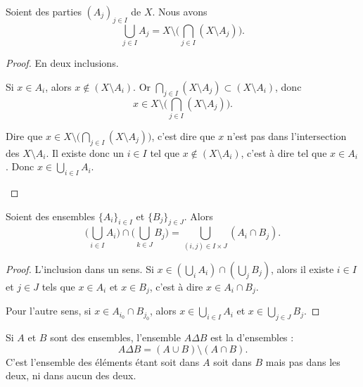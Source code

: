 \begin{lemma}	\label{LEMooMDTPooAhmYqv}
	Soient des parties \( (A_j)_{j\in I}\) de \( X\). Nous avons
	\begin{equation}
		\bigcup_{j\in I}A_j=X\setminus\Big( \bigcap_{j\in I}(X\setminus A_j) \Big).
	\end{equation}
\end{lemma}

\begin{proof}
	En deux inclusions.
	\begin{subproof}
		Si \( x\in A_i\), alors \( x\not\in (X\setminus A_i)\). Or \( \bigcap_{j\in I}(X\setminus A_j)\subset (X\setminus A_i)\), donc
		\begin{equation}
			x\in  X\setminus\Big( \bigcap_{j\in I}(X\setminus A_j) \Big).
		\end{equation}

		Dire que \( x\in  X\setminus\Big( \bigcap_{j\in I}(X\setminus A_j) \Big)\), c'est dire que \( x\) n'est pas dans l'intersection des \( X\setminus A_i\). Il existe donc un \( i\in I\) tel que \( x\notin (X\setminus A_i)\), c'est à dire tel que \( x\in A_i\). Donc \( x\in\bigcup_{i\in I}A_i\).
	\end{subproof}
\end{proof}

\begin{lemma}	\label{LEMooPWUHooMBKquL}
	Soient des ensembles \( \{ A_i \}_{i\in I}\) et \( \{ B_j \}_{j\in J}\). Alors
	\begin{equation}
		\Big( \bigcup_{i\in I}A_i \Big)\cap \Big( \bigcup_{k\in J}B_j \Big)=\bigcup_{(i,j)\in I\times J}(A_i\cap B_j).
	\end{equation}
\end{lemma}

\begin{proof}
	L'inclusion dans un sens. Si \( x\in (\bigcup_iA_i)\cap (\bigcup_{j}B_j)\), alors il existe \( i\in I\) et \( j\in J\) tels que \( x\in A_i\) et \( x\in B_j\), c'est à dire \( x\in A_i\cap B_j\).

	Pour l'autre sens, si \( x\in A_{i_0}\cap B_{j_0}\), alors \( x\in \bigcup_{i\in I}A_i \) et \( x\in \bigcup_{j\in J}B_j\).
\end{proof}

\begin{definition}    \label{DefBMLooVjlSG}
	Si \( A\) et \( B\) sont des ensembles, l'ensemble \( A\Delta B\) est la  d'ensembles :
	\begin{equation}
		A\Delta B=(A\cup B)\setminus(A\cap B).
	\end{equation}
	C'est l'ensemble des éléments étant soit dans \( A\) soit dans \( B\) mais pas dans les deux, ni dans aucun des deux.
\end{definition}

